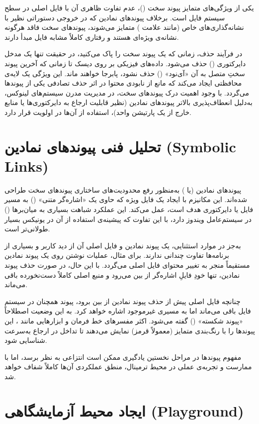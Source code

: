 یکی از ویژگی‌های متمایز پیوند سخت ()، عدم تفاوت ظاهری آن با فایل اصلی در سطح سیستم‌ فایل است. برخلاف پیوندهای نمادین که در خروجی دستوراتی نظیر  با نشانه‌گذاری‌های خاص (مانند علامت \cmd{->}) متمایز می‌شوند، پیوندهای سخت فاقد هرگونه نشانه‌ی ویژه‌ای هستند و رفتاری کاملاً مشابه فایل مبدأ دارند.

در فرآیند حذف، زمانی که یک پیوند سخت را پاک می‌کنید، در حقیقت تنها یک مدخل دایرکتوری () حذف می‌شود. داده‌های فیزیکی بر روی دیسک تا زمانی که آخرین پیوند سختِ متصل به آن «آی‌نود» () حذف نشود، پابرجا خواهند ماند. این ویژگی یک لایه‌ی محافظتی ایجاد می‌کند که مانع از نابودی محتوا در اثر حذف تصادفی یکی از پیوندها می‌گردد. با وجود اهمیت درک پیوندهای سخت، در مدیریت مدرن سیستم‌های لینوکس، به‌دلیل انعطاف‌پذیری بالاتر پیوندهای نمادین (نظیر قابلیت ارجاع به دایرکتوری‌ها یا منابع خارج از یک پارتیشن واحد)، استفاده از آن‌ها در اولویت قرار دارد.

\section{تحلیل فنی پیوندهای نمادین (Symbolic Links)}

پیوندهای نمادین (یا ) به‌منظور رفع محدودیت‌های ساختاری پیوندهای سخت طراحی شده‌اند. این مکانیزم با ایجاد یک فایل ویژه که حاوی یک «اشاره‌گر متنی» () به مسیر فایل یا دایرکتوری هدف است، عمل می‌کند. این عملکرد شباهت بسیاری به میان‌برها () در سیستم‌عامل ویندوز دارد، با این تفاوت که پیشینه‌ی استفاده از آن در یونیکس بسیار طولانی‌تر است.

به‌جز در موارد استثنایی، یک پیوند نمادین و فایل اصلی آن از دید کاربر و بسیاری از برنامه‌ها تفاوت چندانی ندارند. برای مثال، عملیات نوشتن روی یک پیوند نمادین مستقیماً منجر به تغییر محتوای فایل اصلی می‌گردد. با این حال، در صورت حذف پیوند نمادین، تنها خودِ فایلِ اشاره‌گر از بین می‌رود و منبع اصلی کاملاً دست‌نخورده باقی می‌ماند.

چنانچه فایل اصلی پیش از حذف پیوند نمادین از بین برود، پیوند همچنان در سیستم‌ فایل باقی می‌ماند اما به مسیری غیرموجود اشاره خواهد کرد. به این وضعیت اصطلاحاً «پیوند شکسته» () گفته می‌شود. اکثر مفسرهای خط فرمان و ابزارهایی مانند ، این پیوندها را با رنگ‌بندی متمایز (معمولاً قرمز) نمایش می‌دهند تا تداخل در ارجاع به‌سرعت شناسایی شود.

مفهوم پیوندها در مراحل نخستین یادگیری ممکن است انتزاعی به نظر برسد، اما با ممارست و تجربه‌ی عملی در محیط ترمینال، منطق عملکردی آن‌ها کاملاً شفاف خواهد شد.

\section{ایجاد محیط آزمایشگاهی (Playground)}

